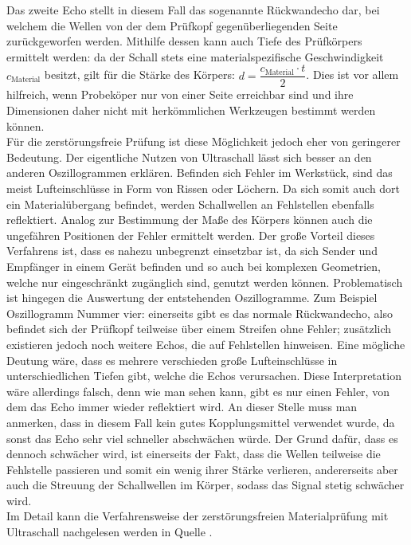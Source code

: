 \documentclass[reducespace,stylepage,semiarbeit]{spezidoc}
\begin{document}
Das zweite Echo stellt in diesem Fall das sogenannte Rückwandecho dar, bei welchem die Wellen von der dem Prüfkopf gegenüberliegenden Seite zurückgeworfen werden. 
Mithilfe dessen kann auch Tiefe des Prüfkörpers ermittelt werden: da der Schall stets eine materialspezifische Geschwindigkeit $c_\mathrm{Material}$  \cite{schallgeschwindigkeiten}  %
besitzt, gilt für die Stärke des Körpers: $d = \dfrac{c_{\mathrm{Material}} \cdot t}{2}$. 
Dies ist vor allem hilfreich, wenn Probeköper nur von einer Seite erreichbar sind und ihre Dimensionen daher nicht mit herkömmlichen Werkzeugen bestimmt werden können.\\
Für die zerstörungsfreie Prüfung ist diese Möglichkeit jedoch eher von geringerer Bedeutung. 
Der eigentliche Nutzen von Ultraschall lässt sich besser an den anderen Oszillogrammen erklären. 
Befinden sich Fehler im Werkstück, sind das meist Lufteinschlüsse in Form von Rissen oder Löchern. 
Da sich somit auch dort ein Materialübergang befindet, werden Schallwellen an Fehlstellen ebenfalls reflektiert. 
Analog zur Bestimmung der Maße des Körpers können auch die ungefähren Positionen der Fehler ermittelt werden. 
Der große Vorteil dieses Verfahrens ist, dass es nahezu unbegrenzt einsetzbar ist, da sich Sender und Empfänger in einem Gerät befinden und so auch bei komplexen Geometrien, welche nur eingeschränkt zugänglich sind, genutzt werden können. 
Problematisch ist hingegen die Auswertung der entstehenden Oszillogramme. 
Zum Beispiel Oszillogramm Nummer vier: einerseits gibt es das normale Rückwandecho, also befindet sich der Prüfkopf teilweise über einem Streifen ohne Fehler; zusätzlich existieren jedoch noch weitere Echos, die auf Fehlstellen hinweisen. 
Eine mögliche Deutung wäre, dass es mehrere verschieden große Lufteinschlüsse in unterschiedlichen Tiefen gibt, welche die Echos verursachen. 
Diese Interpretation wäre allerdings falsch, denn wie man sehen kann, gibt es nur einen Fehler, von dem das Echo immer wieder reflektiert wird. 
An dieser Stelle muss man anmerken, dass in diesem Fall kein gutes Kopplungsmittel verwendet wurde, da sonst das Echo sehr viel schneller abschwächen würde. 
Der Grund dafür, dass es dennoch schwächer wird, ist einerseits der Fakt, dass die Wellen teilweise die Fehlstelle passieren und somit ein wenig ihrer Stärke verlieren, andererseits aber auch die Streuung der Schallwellen im Körper, sodass das Signal stetig schwächer wird.\\
Im Detail kann die Verfahrensweise der zerstörungsfreien Materialprüfung mit Ultraschall nachgelesen werden in Quelle 
\cite{karldeutsch}. %
\end{document}
